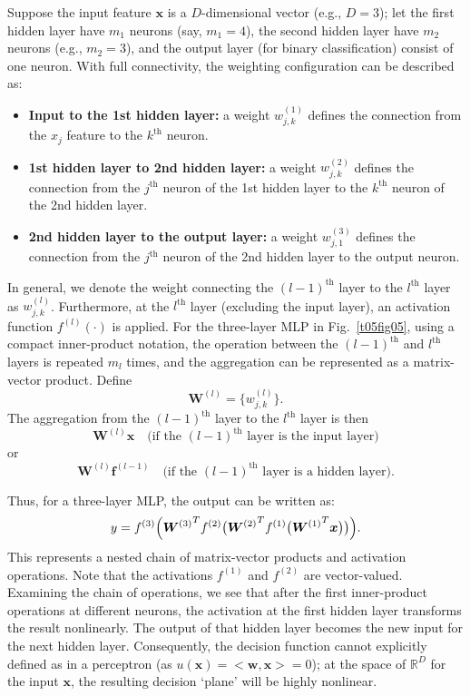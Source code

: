 \documentclass[12pt]{article}
\begin{document}
Suppose the input feature \(\bm{x}\) is a \(D\)-dimensional vector (e.g., \(D=3\)); let the first hidden layer have \(m_1\) neurons (say, \(m_1=4\)), the second hidden layer have \(m_2\) neurons (e.g., \(m_2=3\)), and the output layer (for binary classification) consist of one neuron. With full connectivity, the weighting configuration can be described as:
\begin{itemize}
    \item \textbf{Input to the 1st hidden layer:} a weight \(w_{j,k}^{(1)}\) defines the connection from the \(x_j\) feature to the \(k^\text{th}\) neuron.
    \item \textbf{1st hidden layer to 2nd hidden layer:} a weight \(w_{j,k}^{(2)}\) defines the connection from the \(j^\text{th}\) neuron of the 1st hidden layer to the \(k^\text{th}\) neuron of the 2nd hidden layer.
    \item \textbf{2nd hidden layer to the output layer:} a weight \(w_{j,1}^{(3)}\) defines the connection from the \(j^\text{th}\) neuron of the 2nd hidden layer to the output neuron.
\end{itemize}
In general, we denote the weight connecting the \((l-1)^\text{th}\) layer to the \(l^\text{th}\) layer as \(w_{j,k}^{(l)}\). Furthermore, at the \(l^\text{th}\) layer (excluding the input layer), an activation function \(f^{(l)}(\cdot)\) is applied. For the three-layer MLP in Fig.~\ref{t05fig05}, using a compact inner-product notation, the operation between the \((l-1)^\text{th}\) and \(l^\text{th}\) layers is repeated \(m_l\) times, and the aggregation can be represented as a matrix-vector product. Define
\[
    \bm{W}^{(l)} = \{w_{j,k}^{(l)}\}.
\]
The aggregation from the \((l-1)^\text{th}\) layer to the \(l^\text{th}\) layer is then
\[
    \bm{W}^{(l)} \bm{x} \quad \text{(if the \((l-1)^\text{th}\) layer is the input layer)}
\]
or
\[
    \bm{W}^{(l)} \bm{f}^{(l-1)} \quad \text{(if the \((l-1)^\text{th}\) layer is a hidden layer)}.
\]

Thus, for a three-layer MLP, the output can be written as:
\begin{equation}
    y = f^{(3)}\Bigl( {\bm{W}^{(3)}}^T f^{(2)}\bigl( {\bm{W}^{(2)}}^T f^{(1)}\bigl( {\bm{W}^{(1)}}^T \bm{x} \bigr) \bigr) \Bigr).
\end{equation}
This represents a nested chain of matrix-vector products and activation operations. Note that the activations \(f^{(1)}\) and \(f^{(2)}\) are vector-valued. Examining the chain of operations, we see that after the first inner-product operations at different neurons, the activation at the first hidden layer transforms the result nonlinearly. The output of that hidden layer becomes the new input for the next hidden layer. Consequently, the decision function cannot explicitly defined as in a perceptron (as $u(\bm{x}) = <\bm{w}, \bm{x}> = 0$); at the space of $\mathbb{R}^D$ for the input $\bm{x}$, the resulting decision `plane' will be highly nonlinear. 
\end{document}
